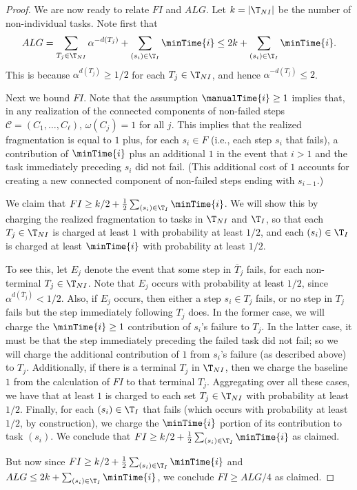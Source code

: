 \begin{proof}
    \medskip

    We are now ready to relate $FI$ and $ALG$.
    Let $k = |\T_{NI}|$ be the number of non-individual tasks.
    Note first that
    \[ ALG = \sum_{T_j \in \T_{NI}} \alpha^{-d(T_j)} + \sum_{(s_i) \in \T_I} \minTime{i} \leq 2k + \sum_{(s_i) \in \T_I} \minTime{i}. \]
    This is because $\alpha^{d(T_j)} \geq 1/2$ for each $T_j \in \T_{NI}$, and hence $\alpha^{-d(T_j)} \leq 2$.

    \medskip

    Next we bound $FI$.
    Note that the assumption $\manualTime{i} \geq 1$ implies that, in any realization of the connected components of non-failed steps $\mathcal{C} = (C_1, \dotsc, C_\ell)$, $\omega(C_j) = 1$ for all $j$.
    This implies that the realized fragmentation is equal to $1$ plus, for each $s_i \in F$ (i.e., each step $s_i$ that fails), a contribution of $\minTime{i}$ plus an additional $1$ in the event that $i > 1$ and the task immediately preceding $s_i$ did not fail.
    (This additional cost of $1$ accounts for creating a new connected component of non-failed steps ending with $s_{i-1}$.)

    We claim that $FI \geq k/2 + \frac{1}{2}\sum_{(s_i) \in \T_I} \minTime{i}$.
    We will show this by charging  the realized fragmentation to tasks in $\T_{NI}$ and $\T_I$, so that each $T_j \in \T_{NI}$ is charged at least $1$ with probability at least $1/2$, and each $(s_i) \in \T_I$ is charged at least $\minTime{i}$ with probability at least $1/2$.

    To see this, let $E_j$ denote the event that some step in $\overline{T}_j$ fails, for each non-terminal $T_j \in \T_{NI}$.
    Note that $E_j$ occurs with probability at least $1/2$, since $\alpha^{d(\overline{T}_j)} < 1/2$.
    Also, if $E_j$ occurs, then either a step $s_i \in T_j$ fails, or no step in $T_j$ fails but the step immediately following $T_j$ does.
    In the former case, we will charge the $\minTime{i} \geq 1$ contribution of $s_i$'s failure to $T_j$.
    In the latter case, it must be that the step immediately preceding the failed task did not fail; so we will charge the additional contribution of $1$ from $s_i$'s failure (as described above) to $T_j$.
    Additionally, if there is a terminal $T_j$ in $\T_{NI}$, then we charge the baseline $1$ from the calculation of $FI$ to that terminal $T_j$.
    Aggregating over all these cases, we have that at least $1$ is charged to each set $T_j \in \T_{NI}$ with probability at least $1/2$.
    Finally, for each $(s_i) \in \T_I$ that fails (which occurs with probability at least $1/2$, by construction), we charge the $\minTime{i}$ portion of its contribution to task $(s_i)$.
    We conclude that $FI \geq k/2 + \frac{1}{2}\sum_{(s_i) \in \T_I}\minTime{i}$ as claimed.

    But now since $FI \geq k/2 + \frac{1}{2}\sum_{(s_i) \in \T_I}\minTime{i}$ and $ALG \leq 2k + \sum_{(s_i) \in \T_I}\minTime{i}$, we conclude $FI \geq ALG/4$ as claimed.
\end{proof}

